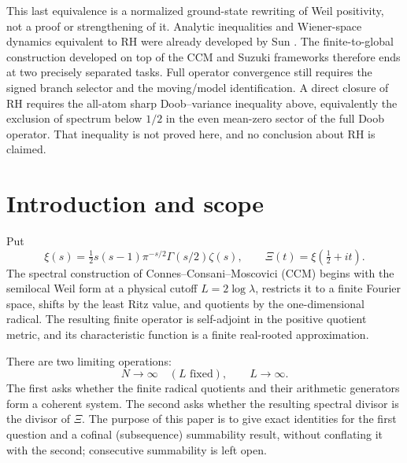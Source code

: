 \documentclass[11pt]{amsart}
\theoremstyle{definition}
\theoremstyle{remark}
\newcommand{\XiR}{\Xi}
\begin{document}
This last equivalence is a normalized ground-state rewriting of Weil
positivity, not a proof or strengthening of it.  Analytic inequalities and
Wiener-space dynamics equivalent to RH were already developed by
Sun \cite{Sun}.  The finite-to-global construction developed on top of the CCM and
Suzuki frameworks therefore ends at two precisely separated tasks.  Full operator
convergence still requires the signed branch selector and the moving/model
identification.  A direct closure of RH requires the all-atom sharp
Doob--variance inequality above, equivalently the exclusion of spectrum
below \(1/2\) in the even mean-zero sector of the full Doob operator.  That
inequality is not proved here, and no conclusion about RH is claimed.
\par\endgroup
\bigskip

\tableofcontents

\section{Introduction and scope}

Put
\[
 \xi(s)=\tfrac12s(s-1)\pi^{-s/2}\Gamma(s/2)\zeta(s),
 \qquad \XiR(t)=\xi(\tfrac12+it).
\]
The spectral construction of Connes--Consani--Moscovici (CCM)
\cite{CCM} begins with the semilocal Weil form at a physical cutoff
\(L=2\log\lambda\), restricts it to a finite Fourier space, shifts by the
least Ritz value, and quotients by the one-dimensional radical.  The
resulting finite operator is self-adjoint in the positive quotient metric,
and its characteristic function is a finite real-rooted approximation.

There are two limiting operations:
\[
 N\longrightarrow\infty\quad(L\text{ fixed}),
 \qquad L\longrightarrow\infty.
\tag{1.1}
\]
The first asks whether the finite radical quotients and their arithmetic
generators form a coherent system.  The second asks whether the resulting
spectral divisor is the divisor of \(\XiR\).  The purpose of this paper is to
give exact identities for the first question and a cofinal (subsequence)
summability result, without conflating it
with the second; consecutive summability is left open.
\end{document}
